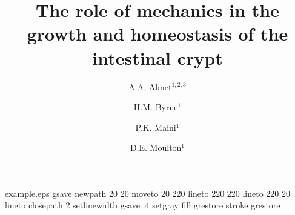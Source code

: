 %
%
%
%
%
\begin{filecontents*}{example.eps}
gsave
newpath
  20 20 moveto
  20 220 lineto
  220 220 lineto
  220 20 lineto
closepath
2 setlinewidth
gsave
  .4 setgray fill
grestore
stroke
grestore
\end{filecontents*}
%
\RequirePackage{fix-cm}
%
\documentclass[twocolumn]{svjour3}          %
%
\smartqed  %
%
\usepackage{graphicx}
\usepackage{graphicx}				%
\usepackage{amssymb}
\usepackage{amsmath}
\usepackage{cite}
\usepackage{color}
\usepackage{float}
\usepackage{url}
\usepackage{setspace}
\usepackage[colorinlistoftodos]{todonotes}
\usepackage{stfloats}
%
%
%
%
%


\title{The role of mechanics in the growth and homeostasis of the intestinal crypt}


\author{A.A. Almet$^{1, 2 ,3}$ \and H.M. Byrne$^1$ \and P.K. Maini$^1$ \and D.E. Moulton$^1$}
\date{}							%

